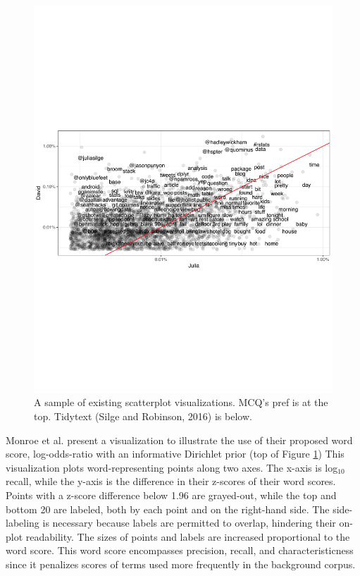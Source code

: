 \documentclass[11pt,a4paper]{article}
\begin{document}
\begin{figure}[h]
\includegraphics[width=\columnwidth]{tidytext}
\caption{A sample of existing scatterplot visualizations. MCQ's pref is at the top. Tidytext (Silge and Robinson, 2016) is below.} 
\label{scatters}
\end{figure}
\vspace{-3mm}
Monroe et al.  present a visualization to illustrate the use of their proposed word score, log-odds-ratio with an informative Dirichlet prior (top of Figure \ref{scatters})  This visualization plots word-representing points along two axes.  The x-axis is log$_{10}$ recall, while the y-axis is the difference in their z-scores of their word scores.  Points with a z-score difference below 1.96 are grayed-out, while the top and bottom 20 are labeled, both by each point and on the right-hand side.  The side-labeling is necessary because labels are permitted to overlap, hindering their on-plot readability.  The sizes of points and labels are increased proportional to the word score. This word score encompasses precision, recall, and characteristicness since it penalizes scores of terms used more frequently in the background corpus. 
\end{document}
